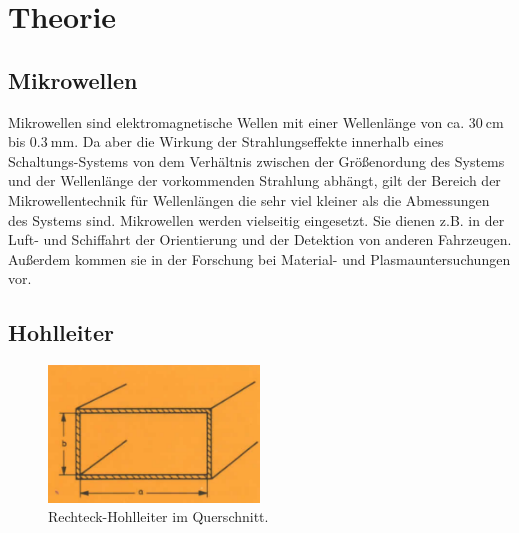 \section{Theorie}
\label{sec:Theorie}



\subsection{Mikrowellen}

Mikrowellen sind elektromagnetische Wellen mit einer Wellenlänge von ca. $\SI{30}{\centi\m}$ bis $\SI{0.3}{\milli\m}$. Da aber die Wirkung der Strahlungseffekte innerhalb eines Schaltungs-Systems von dem Verhältnis zwischen der Größenordung des Systems und der Wellenlänge der vorkommenden Strahlung abhängt, gilt der Bereich der Mikrowellentechnik für Wellenlängen die sehr viel kleiner als die Abmessungen des Systems sind. Mikrowellen werden vielseitig eingesetzt. Sie dienen z.B. in der Luft- und Schiffahrt der Orientierung und der Detektion von anderen Fahrzeugen. Außerdem kommen sie in der Forschung bei Material- und Plasmauntersuchungen vor. 

\subsection{Hohlleiter}


\begin{figure}
    \centering
    \includegraphics[width=0.5\textwidth]{Bilder/hohlleiter_querschnitt.PNG}
    \caption{Rechteck-Hohlleiter im Querschnitt.}
    \label{fig:hohlleiter}
\end{figure}



